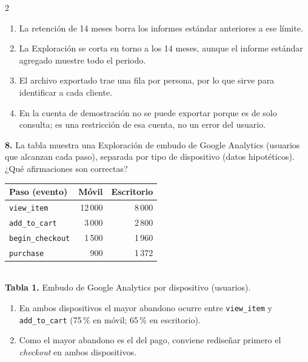 \documentclass[10pt,letterpaper]{article}
\newcommand{\cas}{\framebox[1.0em]{\rule{0pt}{1.05ex}}}
\begin{document}
\begin{multicols}{2}
\begin{minipage}[t]{\columnwidth}
\vspace{1pt}\begin{enumerate}[label=\cas\ \alph*),leftmargin=2.3em,itemsep=1.2pt,topsep=1pt,parsep=0pt,partopsep=0pt]
\item La retención de 14 meses borra los informes estándar anteriores a ese límite.
\item La Exploración se corta en torno a los 14 meses, aunque el informe estándar agregado muestre todo el periodo.
\item El archivo exportado trae una fila por persona, por lo que sirve para identificar a cada cliente.
\item En la cuenta de demostración no se puede exportar porque es de solo consulta; es una restricción de esa cuenta, no un error del usuario.
\end{enumerate}\end{minipage}\par\vspace{3pt}
\begin{minipage}[t]{\columnwidth}\noindent\textbf{8.} La tabla muestra una Exploración de embudo de Google Analytics (usuarios que alcanzan cada paso), separada por tipo de dispositivo (datos hipotéticos). ¿Qué afirmaciones son correctas?
\begin{center}{\scriptsize\renewcommand{\arraystretch}{1.05}\begin{tabular}{@{}lrr@{}}\toprule
Paso (evento) & Móvil & Escritorio\\\midrule
\texttt{view\_item} & 12\,000 & 8\,000\\ \texttt{add\_to\_cart} & 3\,000 & 2\,800\\
\texttt{begin\_checkout} & 1\,500 & 1\,960\\ \texttt{purchase} & 900 & 1\,372\\\bottomrule\end{tabular}}\\[1pt]{\tiny\textbf{Tabla 1.} Embudo de Google Analytics por dispositivo (usuarios).}\end{center}
\vspace{1pt}\begin{enumerate}[label=\cas\ \alph*),leftmargin=2.3em,itemsep=1.2pt,topsep=1pt,parsep=0pt,partopsep=0pt]
\item En ambos dispositivos el mayor abandono ocurre entre \texttt{view\_item} y \texttt{add\_to\_cart} (75\,\% en móvil; 65\,\% en escritorio).
\item Como el mayor abandono es el del pago, conviene rediseñar primero el \textit{checkout} en ambos dispositivos.

\end{enumerate}
\end{minipage}
\end{multicols}
\end{document}
